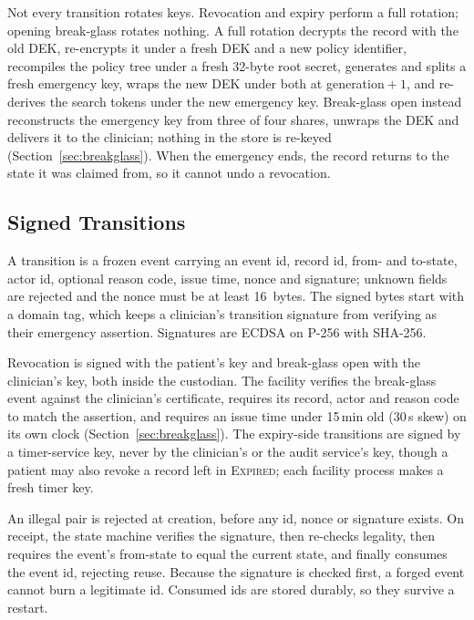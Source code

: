 Not every transition rotates keys.
Revocation and expiry perform a full rotation; opening break-glass rotates
nothing.
A full rotation decrypts the record with the old DEK, re-encrypts it under a
fresh DEK and a new policy identifier, recompiles the policy tree under a fresh
32-byte root secret, generates and splits a fresh emergency key, wraps the new
DEK under both at generation${}+1$, and re-derives the search tokens under the
new emergency key.
Break-glass open instead reconstructs the emergency key from three of four
shares, unwraps the DEK and delivers it to the clinician; nothing in the store
is re-keyed (Section~\ref{sec:breakglass}).
When the emergency ends, the record returns to the state it was claimed
from, so it cannot undo a revocation.

\subsection{Signed Transitions}\label{sec:lifecycle-signing}

A transition is a frozen event carrying an event id,
record id, from- and to-state, actor id, optional reason code, issue time,
nonce and signature; unknown fields are rejected and the nonce must be at
least 16~bytes.
The signed bytes start with a domain tag, which keeps a clinician's
transition signature from verifying as their emergency assertion.
Signatures are ECDSA on P-256 with SHA-256.

Revocation is signed with the patient's key and break-glass open with the
clinician's key, both inside the custodian.
The facility verifies the break-glass event against the clinician's
certificate, requires its record, actor and reason code to match the
assertion, and requires an issue time under 15\,min old (30\,s skew) on its
own clock (Section~\ref{sec:breakglass}).
The expiry-side transitions are signed by a timer-service key, never by the
clinician's or the audit service's key, though a patient may also revoke a
record left in \textsc{Expired}; each facility process makes a fresh timer key.

An illegal pair is rejected at creation, before any id, nonce or signature
exists.
On receipt, the state machine verifies the signature, then re-checks
legality, then requires the event's from-state to equal the current state,
and finally consumes the event id, rejecting reuse.
Because the signature is checked first, a forged event cannot burn a
legitimate id.
Consumed ids are stored durably, so they survive a restart.

